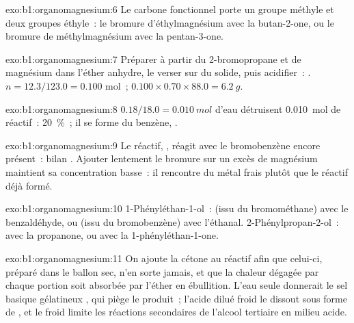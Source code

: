\begin{solution}{exo:b1:organomagnesium:6}
Le carbone fonctionnel porte un groupe méthyle et deux groupes éthyle~:
le bromure d'éthylmagnésium avec la butan-2-one, ou le bromure de
méthylmagnésium avec la pentan-3-one.
\end{solution}

\begin{solution}{exo:b1:organomagnesium:7}
Préparer  à partir du 2-bromopropane et de magnésium
dans l'éther anhydre, le verser sur du  solide, puis acidifier~:
. $n = 12.3/123.0 = 0.100$ mol~;
$0.100 \times 0.70 \times 88.0 = \qty{6.2}{g}$.
\end{solution}

\begin{solution}{exo:b1:organomagnesium:8}
$0.18/18.0 = \qty{0.010}{mol}$ d'eau détruisent \qty{0.010}{mol} de
réactif~: \qty{20}{\percent}~; il se forme du benzène,
.
\end{solution}

\begin{solution}{exo:b1:organomagnesium:9}
Le réactif, , réagit avec le bromobenzène encore présent~:
bilan . Ajouter lentement le
bromure sur un excès de magnésium maintient sa concentration basse~: il
rencontre du métal frais plutôt que le réactif déjà formé.
\end{solution}

\begin{solution}{exo:b1:organomagnesium:10}
1-Phényléthan-1-ol~:  (issu du bromométhane) avec le
benzaldéhyde, ou  (issu du bromobenzène) avec l'éthanal.
2-Phénylpropan-2-ol~:  avec la propanone, ou 
avec la 1-phényléthan-1-one.
\end{solution}

\begin{solution}{exo:b1:organomagnesium:11}
On ajoute la cétone au réactif afin que celui-ci, préparé dans le ballon
sec, n'en sorte jamais, et que la chaleur dégagée par chaque portion
soit absorbée par l'éther en ébullition. L'eau seule donnerait le sel
basique gélatineux , qui piège le produit~; l'acide dilué
froid le dissout sous forme de , et le froid limite les
réactions secondaires de l'alcool tertiaire en milieu acide.
\end{solution}

